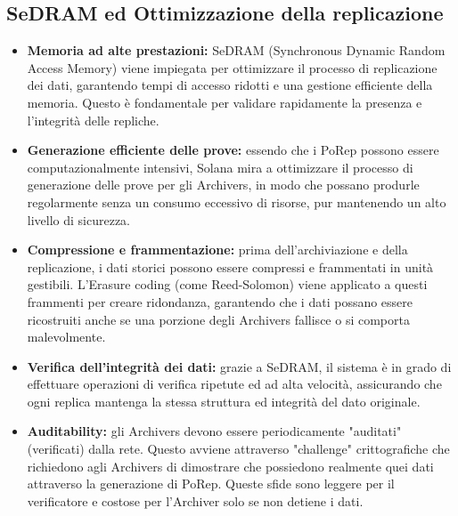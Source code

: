 \documentclass[a4paper,12pt]{report}
\begin{document}
	\subsection{SeDRAM ed Ottimizzazione della replicazione}
	\begin{itemize}
		\item \textbf{Memoria ad alte prestazioni:} SeDRAM (Synchronous Dynamic Random Access Memory) viene impiegata per ottimizzare il processo di replicazione dei dati, garantendo tempi di accesso ridotti e una gestione efficiente della memoria. Questo è fondamentale per validare rapidamente la presenza e l'integrità delle repliche.
		\item \textbf{Generazione efficiente delle prove:} essendo che i PoRep possono essere computazionalmente intensivi, Solana mira a ottimizzare il processo di generazione delle prove per gli Archivers, in modo che possano produrle regolarmente senza un consumo eccessivo di risorse, pur mantenendo un alto livello di sicurezza.
		\item \textbf{Compressione e frammentazione:} prima dell'archiviazione e della replicazione, i dati storici possono essere compressi e frammentati in unità gestibili. L'Erasure coding (come Reed-Solomon) viene applicato a questi frammenti per creare ridondanza, garantendo che i dati possano essere ricostruiti anche se una porzione degli Archivers fallisce o si comporta malevolmente.
		\item \textbf{Verifica dell’integrità dei dati:} grazie a SeDRAM, il sistema è in grado di effettuare operazioni di verifica ripetute ed ad alta velocità, assicurando che ogni replica mantenga la stessa struttura ed integrità del dato originale.
		\item \textbf{Auditability:} gli Archivers devono essere periodicamente "auditati" (verificati) dalla rete. Questo avviene attraverso "challenge" crittografiche che richiedono agli Archivers di dimostrare che possiedono realmente quei dati attraverso la generazione di PoRep. Queste sfide sono leggere per il verificatore e costose per l'Archiver solo se non detiene i dati.
	\end{itemize}
	
\end{document}
